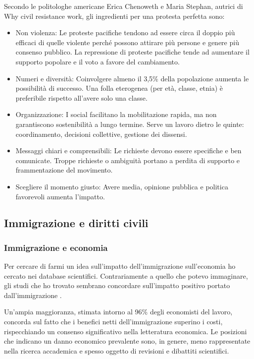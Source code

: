 \documentclass[12pt]{book} %
\begin{document}
\begin{mdframed}[linewidth=1pt]
Secondo le politologhe americane Erica Chenoweth e Maria Stephan, autrici di Why civil resistance work, gli ingredienti per una protesta perfetta sono:
\begin{itemize}
\item Non violenza: Le proteste pacifiche tendono ad essere circa il doppio più efficaci di quelle violente perché possono attirare più persone e genere più consenso pubblico. La repressione di proteste pacifiche tende ad aumentare il supporto popolare e il voto a favore del cambiamento.
\item Numeri e diversità: Coinvolgere almeno il 3,5\% della popolazione aumenta le possibilità di successo. Una folla eterogenea (per età, classe, etnia) è preferibile rispetto all'avere solo una classe.
\item Organizzazione: I social facilitano la mobilitazione rapida, ma non garantiscono sostenibilità a lungo termine. Serve un lavoro dietro le quinte: coordinamento, decisioni collettive, gestione dei dissensi.
\item Messaggi chiari e comprensibili: Le richieste devono essere specifiche e ben comunicate. Troppe richieste o ambiguità portano a perdita di supporto e frammentazione del movimento.
\item Scegliere il momento giusto: Avere media, opinione pubblica e politica favorevoli aumenta l’impatto.
\end{itemize}
\end{mdframed}

\subsection{Immigrazione e diritti civili}

\subsubsection{Immigrazione e economia}
Per cercare di farmi un idea sull'impatto dell'immigrazione sull'economia ho cercato nei database scientifici. Contrariamente a quello che potevo immaginare, gli studi che ho trovato sembrano concordare sull'impatto positivo portato dall'immigrazione  .

Un'ampia maggioranza, stimata intorno al 96\% degli economisti del lavoro, concorda sul fatto che i benefici netti dell'immigrazione superino i costi, rispecchiando un consenso significativo nella letteratura economica. Le posizioni che indicano un danno economico prevalente sono, in genere, meno rappresentate nella ricerca accademica e spesso oggetto di revisioni e dibattiti scientifici.
\end{document}
